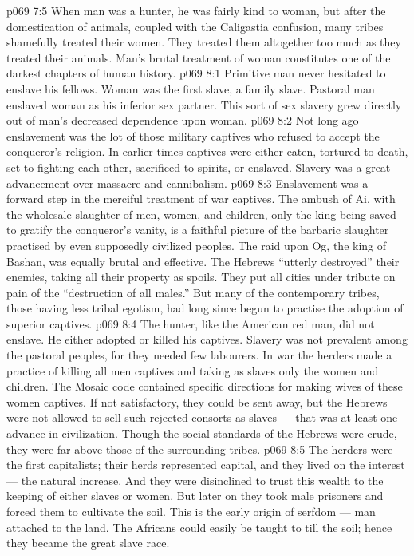 \vs p069 7:5 When man was a hunter, he was fairly kind to woman, but after the domestication of animals, coupled with the Caligastia confusion, many tribes shamefully treated their women. They treated them altogether too much as they treated their animals. Man’s brutal treatment of woman constitutes one of the darkest chapters of human history.
\vs p069 8:1 Primitive man never hesitated to enslave his fellows. Woman was the first slave, a family slave. Pastoral man enslaved woman as his inferior sex partner. This sort of sex slavery grew directly out of man’s decreased dependence upon woman.
\vs p069 8:2 Not long ago enslavement was the lot of those military captives who refused to accept the conqueror’s religion. In earlier times captives were either eaten, tortured to death, set to fighting each other, sacrificed to spirits, or enslaved. Slavery was a great advancement over massacre and cannibalism.
\vs p069 8:3 Enslavement was a forward step in the merciful treatment of war captives. The ambush of Ai, with the wholesale slaughter of men, women, and children, only the king being saved to gratify the conqueror’s vanity, is a faithful picture of the barbaric slaughter practised by even supposedly civilized peoples. The raid upon Og, the king of Bashan, was equally brutal and effective. The Hebrews “utterly destroyed” their enemies, taking all their property as spoils. They put all cities under tribute on pain of the “destruction of all males.” But many of the contemporary tribes, those having less tribal egotism, had long since begun to practise the adoption of superior captives.
\vs p069 8:4 The hunter, like the American red man, did not enslave. He either adopted or killed his captives. Slavery was not prevalent among the pastoral peoples, for they needed few labourers. In war the herders made a practice of killing all men captives and taking as slaves only the women and children. The Mosaic code contained specific directions for making wives of these women captives. If not satisfactory, they could be sent away, but the Hebrews were not allowed to sell such rejected consorts as slaves --- that was at least one advance in civilization. Though the social standards of the Hebrews were crude, they were far above those of the surrounding tribes.
\vs p069 8:5 The herders were the first capitalists; their herds represented capital, and they lived on the interest --- the natural increase. And they were disinclined to trust this wealth to the keeping of either slaves or women. But later on they took male prisoners and forced them to cultivate the soil. This is the early origin of serfdom --- man attached to the land. The Africans could easily be taught to till the soil; hence they became the great slave race.
